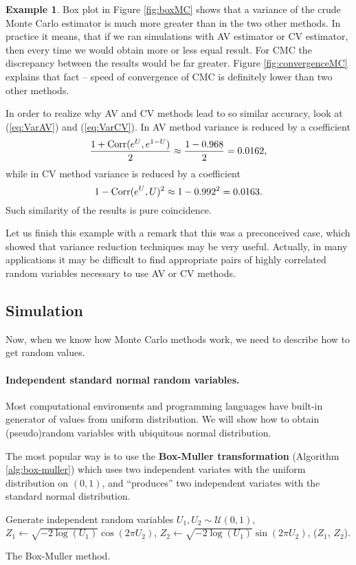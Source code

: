 \documentclass[a4paper,11pt, twoside]{book}
\theoremstyle{definition}
\newtheorem{example}{Example}[chapter]
\theoremstyle{remark}
\def\Corr{{\hbox{Corr}}}
\begin{document}
\begin{example}
Box plot in Figure \ref{fig:boxMC} shows that a variance of the crude Monte Carlo estimator is much more greater than in the two other methods. In practice it means, that if we ran simulations with AV estimator or CV estimator, then every time we would obtain more or less equal result. For CMC the discrepancy between the results would be far greater.
Figure \ref{fig:convergenceMC} explains that fact -- speed of convergence of CMC is definitely lower than two other methods.

In order to realize why AV and CV methods lead to so similar accuracy, look at (\ref{eq:VarAV}) and (\ref{eq:VarCV}). In AV method variance is reduced by a coefficient
\[ \frac{1 + \Corr(e^U, e^{1-U})}{2} \approx \frac{1 - 0.968}{2} = 0.0162, \]
while in CV method variance is reduced by a coefficient
\[ 1 - \Corr(e^U, U)^2 \approx 1 - 0.992^2 = 0.0163. \]
Such similarity of the results is pure coincidence.

Let us finish this example with a remark that this was a preconceived case, which showed that variance reduction techniques may be very useful. Actually, in many applications it may be difficult to find appropriate pairs of highly correlated random variables necessary to use AV or CV methods.
\end{example}


\subsection{Simulation}
Now, when we know how Monte Carlo methods work, we need to describe how to get random values.
\paragraph{Independent standard normal random variables.} Most computational enviroments and programming languages have built-in generator of values from uniform distribution. We will show how to obtain (pseudo)random variables with ubiquitous normal distribution.

The most popular way is to use the \textbf{Box-Muller transformation} (Algorithm \ref{alg:box-muller}) which uses two independent variates with the uniform distribution on $(0,1)$, and ``produces'' two independent variates with the standard normal distribution.
\begin{algorithm}[!ht]
 \begin{algorithmic}[1]
    \State Generate independent random variables $U_1, U_2 \sim \mathcal{U}(0,1)$,
    \State $Z_1 \gets \sqrt{-2\log(U_1)} \cos(2\pi U_2)$,
    \State $Z_2 \gets \sqrt{-2\log(U_1)} \sin(2\pi U_2)$,
    \State \Return ($Z_1$, $Z_2$).
  \EndFunction
 \end{algorithmic}
 \caption{The Box-Muller method.}
 \label{alg:box-muller}
\end{algorithm}
\end{document}
